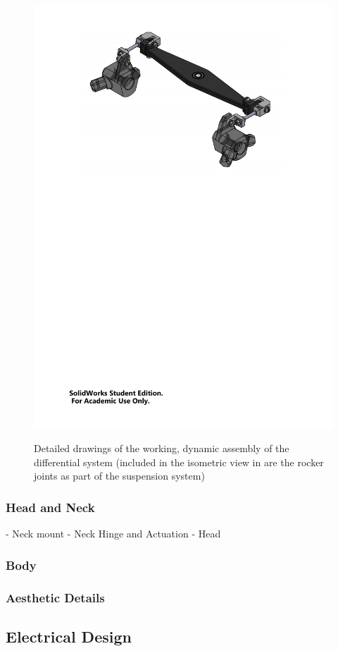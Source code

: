 \begin{figure}[H]
{          \includegraphics[clip, trim=4cm 17cm 4cm 1cm, width=0.7\linewidth]{figures/diff-sub-iso}
        }
        \caption[Detailed drawings of the working, dynamic assembly of the differential system]{Detailed drawings of the working, dynamic assembly of the differential system (included in the isometric view in \protect{} are the rocker joints as part of the suspension system)}
        \label{fig:mechDesign-differentialSubDetail}
        \end{figure}
        
              
    \subsubsection{Head and Neck}
      - Neck mount
      - Neck Hinge and Actuation
      - Head
    
    \subsubsection{Body}
    
    \subsubsection{Aesthetic Details}
    
  \subsection{Electrical Design}

